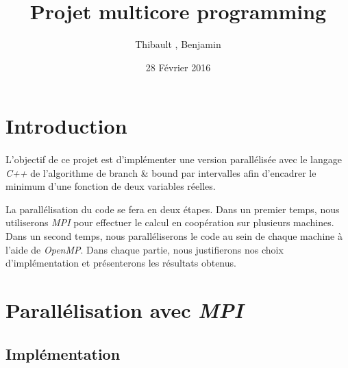\documentclass[a4paper]{article}
\title{Projet multicore programming}
\author{Thibault \bsc{Bèziers la Fosse}, Benjamin \bsc{Moreau}}
\date{28 Février 2016}
\begin{document}
\maketitle

\section{Introduction}
    \paragraph{}
    L'objectif de ce projet est d'implémenter une version parallélisée avec le langage \emph{C++} de l'algorithme de branch \& bound par intervalles afin d'encadrer le minimum d'une fonction de deux variables réelles.
    
    La parallélisation du code se fera en deux étapes. Dans un premier temps, nous utiliserons \emph{MPI} pour effectuer le calcul en coopération sur plusieurs machines. Dans un second temps, nous paralléliserons le code au sein de chaque machine à l'aide de \emph{OpenMP}. Dans chaque partie, nous justifierons nos choix d'implémentation et présenterons les résultats obtenus.
    
\section{Parallélisation avec \emph{MPI}}
    \subsection{Implémentation}
\end{document}
